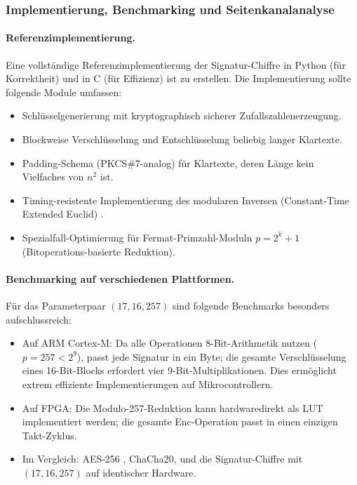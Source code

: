 ﻿\documentclass[a4paper,12pt]{scrreprt}
\theoremstyle{definition}
\begin{document}
\subsubsection{Implementierung, Benchmarking und Seitenkanalanalyse}

\paragraph{Referenzimplementierung.}
Eine vollständige Referenzimplementierung der Signatur-Chiffre in Python (für Korrektheit) und in C (für Effizienz) ist zu erstellen. Die Implementierung sollte folgende Module umfassen:
\begin{itemize}
    \item Schlüsselgenerierung mit kryptographisch sicherer Zufallszahlenerzeugung.
    \item Blockweise Verschlüsselung und Entschlüsselung beliebig langer Klartexte.
    \item Padding-Schema (PKCS\#7-analog) für Klartexte, deren Länge kein Vielfaches von $n^2$ ist.
    \item Timing-resistente Implementierung des modularen Inversen (Constant-Time Extended Euclid) \cite{Koc96}.
    \item Spezialfall-Optimierung für Fermat-Primzahl-Moduln $p = 2^k + 1$ (Bitoperations-basierte Reduktion).
\end{itemize}

\paragraph{Benchmarking auf verschiedenen Plattformen.}
Für das Parameterpaar $(17, 16, 257)$ sind folgende Benchmarks besonders aufschlussreich:
\begin{itemize}
  \item Auf ARM Cortex-M: Da alle Operationen 8-Bit-Arithmetik nutzen ($p = 257 < 2^9$), passt jede Signatur in ein Byte; die gesamte Verschlüsselung eines 16-Bit-Blocks erfordert vier 9-Bit-Multiplikationen. Dies ermöglicht extrem effiziente Implementierungen auf Mikrocontrollern.
  \item Auf FPGA: Die Modulo-257-Reduktion kann hardwaredirekt als LUT implementiert werden; die gesamte Enc-Operation passt in einen einzigen Takt-Zyklus.
  \item Im Vergleich: AES-256 \cite{DR02}, ChaCha20, und die Signatur-Chiffre mit $(17,16,257)$ auf identischer Hardware.
\end{itemize}
\end{document}
